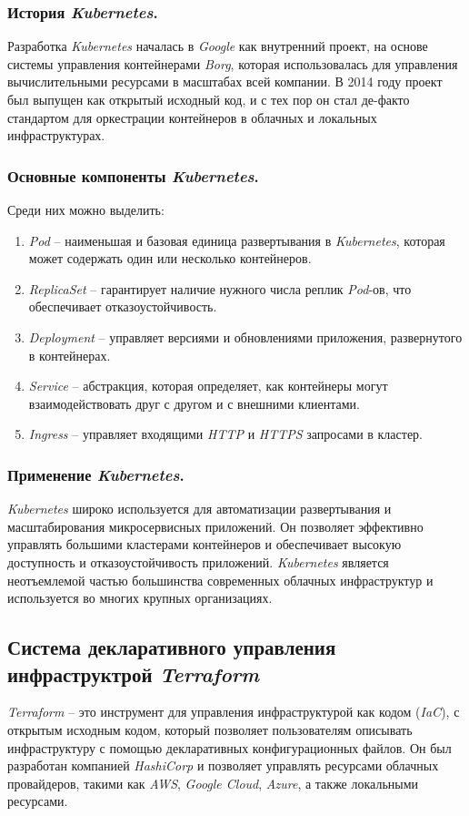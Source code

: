 \subsubsection{История \textit{Kubernetes}.}
Разработка \textit{Kubernetes} началась в \textit{Google} как внутренний проект, на основе системы управления контейнерами \textit{Borg}, которая использовалась для управления вычислительными ресурсами в масштабах всей компании. В 2014 году проект был выпущен как открытый исходный код, и с тех пор он стал де-факто стандартом для оркестрации контейнеров в облачных и локальных инфраструктурах.

\subsubsection{Основные компоненты \textit{Kubernetes}.} Среди них можно выделить:
\begin{enumerate}
    \item \textit{Pod} -- наименьшая и базовая единица развертывания в \textit{Kubernetes}, которая может содержать один или несколько контейнеров.
    \item \textit{ReplicaSet} -- гарантирует наличие нужного числа реплик \textit{Pod}-ов, что обеспечивает отказоустойчивость.
    \item \textit{Deployment} -- управляет версиями и обновлениями приложения, развернутого в контейнерах.
    \item \textit{Service} -- абстракция, которая определяет, как контейнеры могут взаимодействовать друг с другом и с внешними клиентами.
    \item \textit{Ingress} -- управляет входящими \textit{HTTP} и \textit{HTTPS} запросами в кластер.
\end{enumerate}

\subsubsection{Применение \textit{Kubernetes}.}
\textit{Kubernetes} широко используется для автоматизации развертывания и масштабирования микросервисных приложений. Он позволяет эффективно управлять большими кластерами контейнеров и обеспечивает высокую доступность и отказоустойчивость приложений. \textit{Kubernetes} является неотъемлемой частью большинства современных облачных инфраструктур и используется во многих крупных организациях.

\subsection{Система декларативного управления инфраструктрой \textit{Terraform}}
\label{sec:terraform}
\textit{Terraform} -- это инструмент для управления инфраструктурой как кодом (\textit{IaC}), с открытым исходным кодом, который позволяет пользователям описывать инфраструктуру с помощью декларативных конфигурационных файлов. Он был разработан компанией \textit{HashiCorp} и позволяет управлять ресурсами облачных провайдеров, такими как \textit{AWS}, \textit{Google Cloud}, \textit{Azure}, а также локальными ресурсами.

